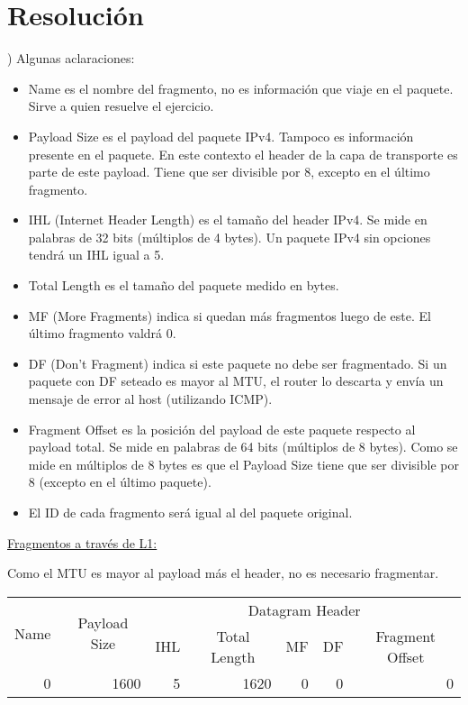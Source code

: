 \section*{Resolución}

) Algunas aclaraciones:

\begin{itemize}
    \item Name es el nombre del fragmento, no es información que viaje en el paquete. Sirve a quien resuelve el ejercicio.
    \item Payload Size es el payload del paquete IPv4. Tampoco es información presente en el paquete. En este contexto el header de la capa de transporte es parte de este payload. Tiene que ser divisible por 8, excepto en el último fragmento.
    \item IHL (Internet Header Length) es el tamaño del header IPv4. Se mide en palabras de 32 bits (múltiplos de 4 bytes). Un paquete IPv4 sin opciones tendrá un IHL igual a 5.
    \item Total Length es el tamaño del paquete medido en bytes.
    \item MF (More Fragments) indica si quedan más fragmentos luego de este. El último fragmento valdrá 0.
    \item DF (Don't Fragment) indica si este paquete no debe ser fragmentado. Si un paquete con DF seteado es mayor al MTU, el router lo descarta y envía un mensaje de error al host (utilizando ICMP).
    \item Fragment Offset es la posición del payload de este paquete respecto al payload total. Se mide en palabras de 64 bits (múltiplos de 8 bytes). Como se mide en múltiplos de 8 bytes es que el Payload Size tiene que ser divisible por 8 (excepto en el último paquete).
    \item El ID de cada fragmento será igual al del paquete original.
\end{itemize}


\noindent
\underline{Fragmentos a través de L1:}

\skipline
Como el MTU es mayor al payload más el header, no es necesario fragmentar.

\begin{table}[H]
    \renewcommand{\arraystretch}{1.5}
    \centering
    \begin{tabular}{|c|c|crrrr|}
    \hline
    \multirow{2}{*}{Name} & \multirow{2}{*}{Payload Size} & \multicolumn{5}{c|}{Datagram Header} \\ \cline{3-7} 
        &  & \multicolumn{1}{c|}{IHL} & \multicolumn{1}{c|}{Total Length} & \multicolumn{1}{c|}{MF} & \multicolumn{1}{c|}{DF} & \multicolumn{1}{c|}{Fragment Offset} \\ \hline
    \multicolumn{1}{|r|}{0} & \multicolumn{1}{r|}{1600} & \multicolumn{1}{r|}{5} & \multicolumn{1}{r|}{1620} & \multicolumn{1}{r|}{0} & \multicolumn{1}{r|}{0} & 0 \\ \hline
    \end{tabular}
\end{table}


